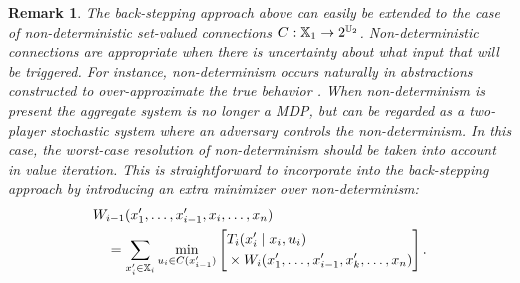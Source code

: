 \documentclass[conference]{IEEEtran}
\newtheorem{remark}{Remark}
\begin{document}


\begin{remark}
	The back-stepping approach above can easily be extended to the case of \emph{non-deterministic} set-valued connections $C : \mathbb{X}_1 \rightarrow 2^{\mathbb{U}_2}$. Non-deterministic connections are appropriate when there is uncertainty about what input that will be triggered. For instance, non-determinism occurs naturally in abstractions constructed to over-approximate the true behavior \cite{Haesaert18}. When non-determinism is present the aggregate system is no longer a MDP, but can be regarded as a two-player stochastic system where an adversary controls the non-determinism. In this case, the worst-case resolution of non-determinism should be taken into account in value iteration. This is straightforward to incorporate into the back-stepping approach by introducing an extra minimizer over non-determinism:
	\begin{equation*}
	\begin{aligned}
	  & W_{i-1}(x_1', \ldots, x_{i-1}', x_i, \ldots, x_n) \\
	  & \quad = \sum_{x_{i}' \in \mathbb{X}_{i}} \min_{u_i \in C(x_{i-1}')} \left[ \begin{aligned} & T_{i} (x_{i}' \mid x_{i}, u_i) \\ 
	   & \times W_{i} (x_1', \ldots, x_{i-1}', x_k', \ldots, x_n)
	    \end{aligned} \right].
	\end{aligned}
	\end{equation*}
\end{remark}


\end{document}
